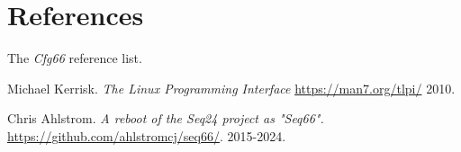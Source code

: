 %
%
%

\section{References}
\label{sec:references}

   The \textsl{Cfg66} reference list.

{\RaggedRight
\begin{thebibliography}{99}

   Michael Kerrisk.
   \emph{The Linux Programming Interface}
   \url{https://man7.org/tlpi/}
   2010.

   Chris Ahlstrom.
   \emph{A reboot of the Seq24 project as "Seq66".}
   \url{https://github.com/ahlstromcj/seq66/}.
   2015-2024.

\end{thebibliography}
}

